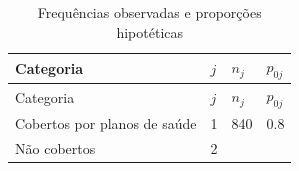 \documentclass[]{book}
\numberwithin{example}{chapter}
\numberwithin{remark}{chapter}
\numberwithin{definition}{chapter}
\begin{document}
\begin{longtable}[]{@{}llll@{}}
\caption{\label{tab:prophip} Frequências observadas e proporções
hipotéticas}\tabularnewline
\toprule
\begin{minipage}[b]{0.23\columnwidth}\raggedright\strut
Categoria\strut
\end{minipage} & \begin{minipage}[b]{0.05\columnwidth}\raggedright\strut
\(j\)\strut
\end{minipage} & \begin{minipage}[b]{0.07\columnwidth}\raggedright\strut
\(n_j\)\strut
\end{minipage} & \begin{minipage}[b]{0.11\columnwidth}\raggedright\strut
\(p_{0j}\)\strut
\end{minipage}\tabularnewline
\midrule
\endfirsthead
\toprule
\begin{minipage}[b]{0.23\columnwidth}\raggedright\strut
Categoria\strut
\end{minipage} & \begin{minipage}[b]{0.05\columnwidth}\raggedright\strut
\(j\)\strut
\end{minipage} & \begin{minipage}[b]{0.07\columnwidth}\raggedright\strut
\(n_j\)\strut
\end{minipage} & \begin{minipage}[b]{0.11\columnwidth}\raggedright\strut
\(p_{0j}\)\strut
\end{minipage}\tabularnewline
\midrule
\endhead
\begin{minipage}[t]{0.23\columnwidth}\raggedright\strut
Cobertos por planos de saúde\strut
\end{minipage} & \begin{minipage}[t]{0.05\columnwidth}\raggedright\strut
1\strut
\end{minipage} & \begin{minipage}[t]{0.07\columnwidth}\raggedright\strut
840\strut
\end{minipage} & \begin{minipage}[t]{0.11\columnwidth}\raggedright\strut
0.8\strut
\end{minipage}\tabularnewline
\begin{minipage}[t]{0.23\columnwidth}\raggedright\strut
Não cobertos\strut
\end{minipage} & \begin{minipage}[t]{0.05\columnwidth}\raggedright\strut
2\strut
\end{minipage} & \begin{minipage}[t]{0.07\columnwidth}\raggedright\strut

\end{minipage}
\end{longtable}
\end{document}
